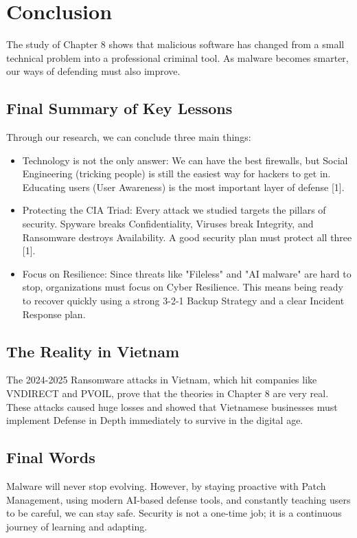\section{Conclusion}

The study of Chapter 8 shows that malicious software has changed from a small technical problem into a professional criminal tool. As malware becomes smarter, our ways of defending must also improve.

\subsection{Final Summary of Key Lessons}

Through our research, we can conclude three main things:

\begin{itemize}
  \item Technology is not the only answer: We can have the best firewalls, but Social Engineering (tricking people) is still the easiest way for hackers to get in. Educating users (User Awareness) is the most important layer of defense [1].
  \item Protecting the CIA Triad: Every attack we studied targets the pillars of security. Spyware breaks Confidentiality, Viruses break Integrity, and Ransomware destroys Availability. A good security plan must protect all three [1].
  \item Focus on Resilience: Since threats like "Fileless" and "AI malware" are hard to stop, organizations must focus on Cyber Resilience. This means being ready to recover quickly using a strong 3-2-1 Backup Strategy and a clear Incident Response plan.
\end{itemize}

\subsection{The Reality in Vietnam}

The 2024-2025 Ransomware attacks in Vietnam, which hit companies like VNDIRECT and PVOIL, prove that the theories in Chapter 8 are very real. These attacks caused huge losses and showed that Vietnamese businesses must implement Defense in Depth immediately to survive in the digital age.

\subsection{Final Words}

Malware will never stop evolving. However, by staying proactive with Patch Management, using modern AI-based defense tools, and constantly teaching users to be careful, we can stay safe. Security is not a one-time job; it is a continuous journey of learning and adapting.

